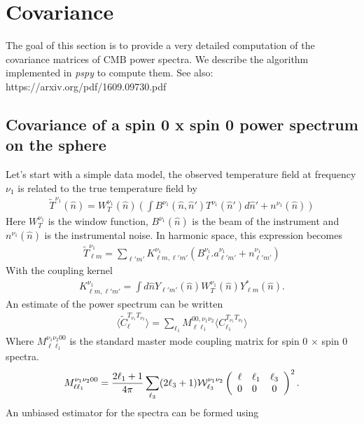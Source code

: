 \documentclass[a4paper, 11pt]{article}
\def\ba{\begin{eqnarray}}
\def\ea{\end{eqnarray}}
\begin{document}
\section{Covariance}


The goal of this section is to provide a very detailed computation of the covariance matrices of CMB power spectra. We describe the algorithm implemented in {\it pspy} to compute them. 
See also: https://arxiv.org/pdf/1609.09730.pdf

\subsection{Covariance of a spin 0 x spin 0 power spectrum on the sphere}

Let's start with a simple data model, the observed temperature field at frequency $\nu_{1}$ is related to the true temperature field by
\ba
\tilde{T}^{\nu_{1}}(\hat{n})= W_{T}^{ \nu_{1}}(\hat{n}) \left(\int B^{\nu_{1}}(\hat{n},\hat{n}')  T^{\nu_{1}}(\hat{n}')d\hat{n}' + n^{\nu_{1}}(\hat{n}) \right)
\ea
Here $W_{T}^{ \nu_{1}}$ is the window function,  $B^{\nu_{1}}(\hat{n})$ is the beam of the instrument and $n^{\nu_{1}}(\hat{n}) $ is the instrumental noise. In harmonic space, this expression becomes
\ba
\tilde{T}^{\nu_{1}}_{ \ell m}= \sum_{\ell' m'} K^{\nu_{1}}_{\ell m, \ell' m'}( B^{\nu_{1}}_{\ell'} a^{\nu_{1}}_{\ell'm'} + n^{\nu_{1}}_{ \ell' m'})
\ea
With the coupling kernel
\ba
 K^{\nu_{1}}_{\ell m, \ell' m'}= \int d \hat{n} Y_{\ell' m'} (\hat{n}) W_{T}^{ \nu_{1}}(\hat{n})Y^{*}_{\ell m} (\hat{n}).
\ea
An estimate of the power spectrum can be written
\ba
\langle \tilde{C}^{T_{\nu_{1}}T_{\nu_{2}}}_{\ell} \rangle = \sum_{\ell_1}M^{00, \nu_{1}\nu_{2}}_{ \ell \ell_1} \langle C^{T_{\nu_{1}}T_{\nu_{2}}}_{\ell_1} \rangle
\ea
Where $M^{\nu_{1}\nu_{2}00}_{ \ell \ell_1}$ is the standard master mode coupling matrix for spin 0 $\times$ spin 0 spectra.
\ba
M^{\nu_{1}\nu_{2}00}_{ \ell \ell_1}=   \frac{2\ell_1 +1}{4\pi}  \sum_{ \ell_3} (2\ell_3+1) {\cal W}^{\nu_{1}\nu_{2}}_{\ell_3} 
\left(\begin{array}{clcr}
\ell & \ell_1 & \ell_3\\
0 & 0 & 0 \end{array}\right)^{2} .
\ea 
An unbiased estimator for the spectra can be formed using
\end{document}
